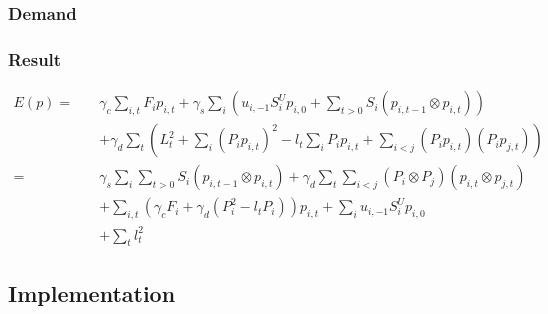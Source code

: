 
\subsubsection{Demand}


\subsubsection{Result}

\begin{subequations}
\begin{align}
  E(p) = \quad
  &
  \gamma_c \sum_{i, t} F_i p_{i, t}
  + \gamma_s \sum_i \left(
      u_{i, -1} S_i^U p_{i, 0}
      + \sum_{t > 0} S_i \left( p_{i, t-1} \otimes p_{i, t} \right)
    \right)
  \\ &
  + \gamma_d \sum_t \left(
    L_t^2
    + \sum_i \left( P_i p_{i, t} \right)^2 - l_t \sum_i P_i p_{i, t}
    + \sum_{i < j} \left( P_i p_{i, t} \right) \left( P_i p_{j, t} \right)
  \right) \\
  = \quad
  &
  \gamma_s \sum_i \sum_{t > 0} S_i \left( p_{i, t-1} \otimes p_{i, t} \right)
  + \gamma_d \sum_t \sum_{i < j} \left( P_i \otimes P_j \right) \left( p_{i, t} \otimes p_{j, t} \right)
  \\ &
  + \sum_{i, t} \left(
    \gamma_c F_i + \gamma_d \left(P_i^2 - l_t P_i \right)
  \right) p_{i, t}
  + \sum_i u_{i, -1} S_i^U p_{i, 0}
  \\ &
  + \sum_t l_t^2
\end{align}
\end{subequations}


\subsection{Implementation}

